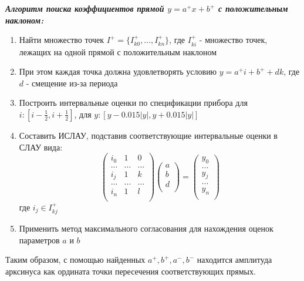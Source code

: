 \documentclass[12pt,a4paper]{article}
\begin{document}
\textbf{\textit{Алгоритм поиска коэффициентов прямой $y=a^+x+b^+$ с положительным наклоном:}}
\begin{enumerate}
    \item Найти множество точек $I^+=\{I^+_{k0},...,I^+_{kn}\}$, где $I^+_{ki}$ - множество точек, лежащих на одной прямой с положительным наклоном
    \item При этом каждая точка должна удовлетворять условию $y=a^+i+b^++dk$, где $d$ - смещение из-за периода
    \item Построить интервальные оценки по спецификации прибора для $i:[i-\frac{1}{2},i+\frac{1}{2}]$, для $y:[y-0.015|y|,y+0.015|y|]$
    \item Составить ИСЛАУ, подставив соответствующие интервальные оценки в СЛАУ вида:
        \begin{equation}
            \begin{pmatrix}
                i_0 & 1 & 0\\
                ... & ... & ...\\
                i_j & 1 & k\\
                ... & ... & ...\\
                i_n & 1 & l\\        
            \end{pmatrix}
            \begin{pmatrix}
                a\\
                b\\
                d\\
            \end{pmatrix}
            =
            \begin{pmatrix}
                y_0\\
                ...\\
                y_j\\
                ...\\
                y_n\\        
            \end{pmatrix}
        \end{equation}
        где $i_j\in{I^+_{kj}}$
    \item Применить метод максимального согласования для нахождения оценок параметров $a$ и $b$
\end{enumerate}

Таким образом, с помощью найденных $a^+,b^+,a^-,b^-$ находится амплитуда арксинуса как ордината точки пересечения соответствующих прямых.
\end{document}
